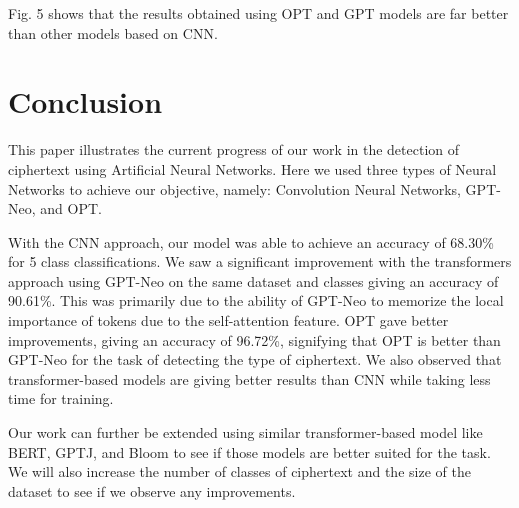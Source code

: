 \documentclass[runningheads]{llncs}
\begin{document}
Fig. 5 shows that the results obtained using OPT and GPT models are far better than other models based on CNN.

\section{Conclusion}

This paper illustrates the current progress of our work in the detection of ciphertext using Artificial Neural Networks. Here we used three types of Neural Networks to achieve our objective, namely: Convolution Neural Networks, GPT-Neo, and OPT. 

With the CNN approach, our model was able to achieve an accuracy of 68.30\% for 5 class classifications. We saw a significant improvement with the transformers approach using GPT-Neo on the same dataset and classes giving an accuracy of 90.61\%. This was primarily due to the ability of GPT-Neo to memorize the local importance of tokens due to the self-attention feature. OPT gave better improvements, giving an accuracy of 96.72\%, signifying that OPT is better than GPT-Neo for the task of detecting the type of ciphertext. We also observed that transformer-based models are giving better results than CNN while taking less time for training.

Our work can further be extended using similar transformer-based model like BERT, GPTJ, and Bloom to see if those models are better suited for the task. We will also increase the number of classes of ciphertext and the size of the dataset to see if we observe any improvements.


\end{document}

